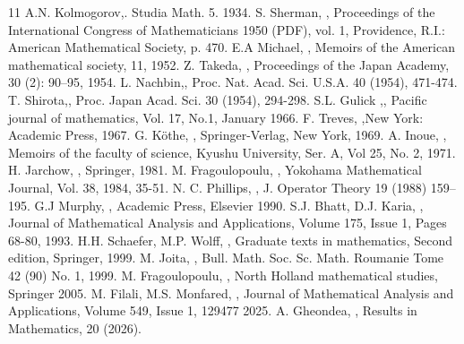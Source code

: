 \documentclass[10pt]{article}
\theoremstyle{definition}
\begin{document}
	\begin{thebibliography}{11}
		A.N. Kolmogorov,. Studia Math. 5. 1934.
		S. Sherman, , Proceedings of the International Congress of Mathematicians 1950 (PDF), vol. 1, Providence, R.I.: American Mathematical Society, p. 470.
		E.A Michael, , Memoirs of the American mathematical society, 11, 1952.
		Z. Takeda, , Proceedings of the Japan Academy, 30 (2): 90–95, 1954.
		L. Nachbin,, Proc. Nat. Acad. Sci. U.S.A. 40 (1954), 471-474.
		 T. Shirota,, Proc. Japan Acad. Sci. 30 (1954), 294-298. 
		 S.L. Gulick ,, Pacific journal of mathematics, Vol. 17, No.1, January 1966.
		 F. Treves, ,New York: Academic Press, 1967.
		 G. Köthe, , Springer-Verlag, New York, 1969.
		A. Inoue, , Memoirs of the faculty of science, Kyushu University, Ser. A, Vol 25, No. 2, 1971.
		H. Jarchow, , Springer, 1981.
		 M. Fragoulopoulu, , Yokohama Mathematical Journal, Vol. 38, 1984, 35-51.
		N. C. Phillips, , J. Operator Theory 19 (1988) 159–195.
		 G.J Murphy, , Academic Press, Elsevier 1990.
		S.J. Bhatt, D.J. Karia,
		,
		Journal of Mathematical Analysis and Applications,
		Volume 175, Issue 1,
		Pages 68-80, 1993.
		 H.H. Schaefer, M.P. Wolff, , Graduate texts in mathematics, Second edition, Springer, 1999.
		 M. Joita, ,  Bull. Math. Soc. Sc. Math. Roumanie
		Tome 42 (90) No. 1, 1999.
		M. Fragoulopoulu, , North Holland mathematical studies, Springer 2005.
		M. Filali, M.S. Monfared, ,
		Journal of Mathematical Analysis and Applications,
		Volume 549, Issue 1,
		129477
		2025.
		A. Gheondea, , Results in Mathematics, 20 (2026).
	\end{thebibliography}
	\Addresses
\end{document}
